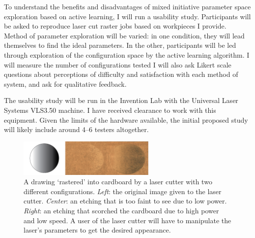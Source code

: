 \documentclass[12pt]{article}
\begin{document}
To understand the benefits and disadvantages of mixed initiative parameter space exploration based on active learning, I will run a usability study.
Participants will be asked to reproduce laser cut raster jobs based on workpieces I provide.
Method of parameter exploration will be varied:
in one condition, they will lead themselves to find the ideal parameters.
In the other, participants will be led through exploration of the configuration space by the active learning algorithm.
I will measure the number of configurations tested 
I will also ask Likert scale questions about perceptions of difficulty and satisfaction with each method of system, and ask for qualitative feedback.

The usability study will be run in the Invention Lab with the Universal Laser Systems VLS3.50 machine.
I have received clearance to work with this equipment.
Given the limits of the hardware available, the initial proposed study will likely include around 4--6 testers altogether.

\begin{figure}
  \centering
  \includegraphics[width=0.6\textwidth]{figures/rasters}
  \caption{\small{%
  A drawing `rastered' into cardboard by a laser cutter with two different configurations.
  \emph{Left}: the original image given to the laser cutter.
  \emph{Center}: an etching that is too faint to see due to low power.
  \emph{Right}: an etching that scorched the cardboard due to high power and low speed.
  A user of the laser cutter will have to manipulate the laser's parameters to get the desired appearance.}}
\label{fig:rasters}
\end{figure}

\printbibliography[heading=none]
\end{document}
